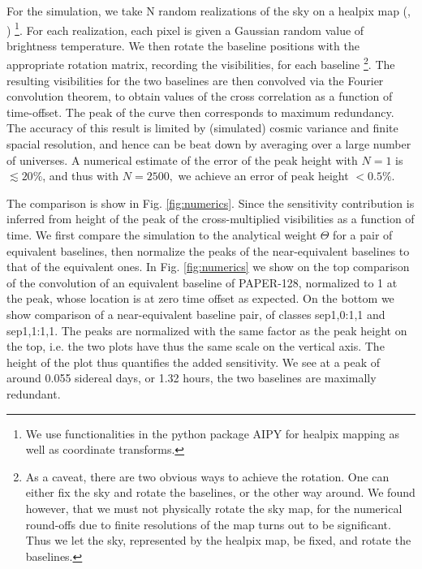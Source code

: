 \documentclass[preprint2,numberedappendix,tighten,twocolappendix]{aastex6}  %
\renewcommand\[{\begin{equation}}
\renewcommand\]{\end{equation}}
\begin{document}
For the simulation, we take N random realizations of the sky
on a healpix map (\cite{Heal}, \cite{HealPrimer}) \footnote{We use functionalities in the python package AIPY for healpix mapping
as well as coordinate transforms. }. For each realization, each pixel is given a Gaussian random value
of brightness temperature. We then rotate the baseline positions with
the appropriate rotation matrix, recording the visibilities, for each
baseline \footnote{As a caveat, there are two obvious ways to achieve the rotation. One
can either fix the sky and rotate the baselines, or the other way
around. We found however, that we must not physically rotate the sky
map, for the numerical round-offs due to finite resolutions of the
map turns out to be significant. Thus we let the sky, represented
by the healpix map, be fixed, and rotate the baselines. }. The resulting visibilities for the two baselines are then convolved
via the Fourier convolution theorem, to obtain values of the cross
correlation as a function of time-offset. The peak of the curve then
corresponds to maximum redundancy. The accuracy of this result is
limited by (simulated) cosmic variance and finite spacial resolution,
and hence can be beat down by averaging over a large number of universes.
A numerical estimate of the error of the peak height with $N=1$ is
$\lesssim20\%$, and thus with $N=2500,$ we achieve an error of peak
height $<0.5\%$. 

The comparison is show in Fig. \ref{fig:numerics}. 
Since the sensitivity contribution is inferred from height of the peak of the cross-multiplied visibilities as a function of time. 
We first compare the simulation to the analytical weight $\Theta$ for a pair of equivalent baselines, then normalize the peaks 
of the near-equivalent baselines to that of the equivalent ones. 
In Fig. \ref{fig:numerics}  we show on the top comparison of
the convolution of an equivalent baseline of PAPER-128, normalized to 1 at the
peak, whose location is at zero time offset as expected. On the bottom we show
comparison of a near-equivalent baseline pair, of classes sep1,0:1,1 and sep1,1:1,1. The peaks
are normalized with the same factor as the peak height on the top,
i.e. the two plots have thus the same scale on the vertical axis.
The height of the plot thus quantifies the added sensitivity. We see at a peak of around 0.055 sidereal days, or 1.32 hours, the two baselines are maximally redundant. 
\end{document}
